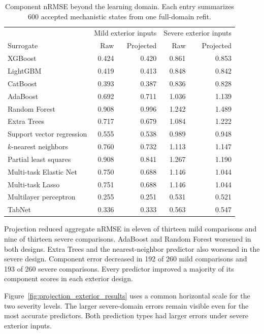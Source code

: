 \begin{table}[htbp]
\centering\small
\caption{Component nRMSE beyond the learning domain. Each entry summarizes 600 accepted mechanistic states from one full-domain refit. }
\label{tab:projection_exterior_results}
\begin{tabular}{p{4.5cm}rrrr}
\toprule
& \multicolumn{2}{c}{Mild exterior inputs} & \multicolumn{2}{c}{Severe exterior inputs}\\
Surrogate & Raw & Projected & Raw & Projected\\
\midrule
XGBoost & 0.424 & 0.420 & 0.861 & 0.853\\
LightGBM & 0.419 & 0.413 & 0.848 & 0.842\\
CatBoost & 0.393 & 0.387 & 0.836 & 0.828\\
AdaBoost & 0.692 & 0.711 & 1.036 & 1.139\\
Random Forest & 0.908 & 0.996 & 1.242 & 1.489\\
Extra Trees & 0.717 & 0.679 & 1.084 & 1.222\\
Support vector regression & 0.555 & 0.538 & 0.989 & 0.948\\
$k$-nearest neighbors & 0.760 & 0.732 & 1.113 & 1.147\\
Partial least squares & 0.908 & 0.841 & 1.267 & 1.190\\
Multi-task Elastic Net & 0.750 & 0.688 & 1.146 & 1.044\\
Multi-task Lasso & 0.751 & 0.688 & 1.146 & 1.044\\
Multilayer perceptron & 0.255 & 0.251 & 0.531 & 0.521\\
TabNet & 0.336 & 0.333 & 0.563 & 0.547\\
\bottomrule
\end{tabular}
\end{table}

Projection reduced aggregate nRMSE in eleven of thirteen mild comparisons and nine of thirteen severe comparisons. AdaBoost and Random Forest worsened in both designs. Extra Trees and the nearest-neighbor predictor also worsened in the severe design. Component error decreased in 192 of 260 mild comparisons and 193 of 260 severe comparisons. Every predictor improved a majority of its component scores in each exterior design.

Figure~\ref{fig:projection_exterior_results} uses a common horizontal scale for the two severity levels. The larger severe-domain errors remain visible even for the most accurate predictors. Both prediction types had larger errors under severe exterior inputs.

